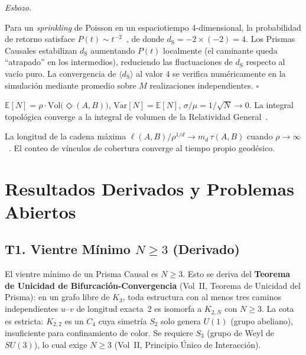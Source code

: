 \documentclass[11pt, a4paper, openany]{book}
\newcommand{\dS}{d_{\mathrm{S}}}
\newcommand{\diam}[2]{\Diamond(#1,#2)}
\renewenvironment{proof}[1][Demostraci\'on]{%
  \par\noindent\textit{#1.}\quad
}{\hfill$\square$\par\medskip}
\begin{document}
\begin{proof}[Esbozo]
Para un \emph{sprinkling} de Poisson en un espaciotiempo
4-dimensional, la probabilidad de retorno satisface
$P(t) \sim t^{-2}$~\cite{eichhorn2014}, de donde $\dS = -2
\times (-2) = 4$. Los Prismas Causales estabilizan $\dS$
aumentando $P(t)$ localmente (el caminante queda ``atrapado''
en los intermedios), reduciendo las fluctuaciones de $\dS$
respecto al vac\'io puro. La convergencia de $\langle \dS \rangle$
al valor $4$ se verifica num\'ericamente en la simulaci\'on
mediante promedio sobre $M$ realizaciones independientes.
\end{proof}

\begin{theorem}
\label{thm:app-poisson-vol}
$\mathbb{E}[N] = \rho \cdot \mathrm{Vol}\bigl(\diam{A}{B}\bigr)$,
$\mathrm{Var}[N] = \mathbb{E}[N]$, $\sigma/\mu = 1/\sqrt{N}
\to 0$. La integral topol\'ogica converge a la integral de
volumen de la Relatividad General~\cite{bombelli1987}.
\end{theorem}

\begin{theorem}
\label{thm:app-mm}
La longitud de la cadena m\'axima
$\ell(A,B)/\rho^{1/d} \to m_d\,\tau(A,B)$ cuando
$\rho \to \infty$~\cite{myrheim1978,brightwell1991}. El conteo
de v\'inculos de cobertura converge al tiempo propio
geod\'esico.
\end{theorem}

\section{Resultados Derivados y Problemas Abiertos}

\subsection*{T1. Vientre M\'inimo $N \geq 3$ (Derivado)}
\label{thm-ref:min-belly}

El vientre m\'inimo de un Prisma Causal es $N \geq 3$. Esto se
deriva del \textbf{Teorema de Unicidad de Bifurcaci\'on-Convergencia}
(Vol~II, Teorema de Unicidad del Prisma): en un grafo libre de $K_3$,
toda estructura con al menos tres caminos independientes $u$--$v$ de
longitud exacta~2 es isomorfa a $K_{2,N}$ con $N \geq 3$. La cota es
estricta: $K_{2,2}$ es un $C_4$ cuya simetr\'ia $S_2$ solo genera
$U(1)$ (grupo abeliano), insuficiente para confinamiento de color. Se
requiere $S_3$ (grupo de Weyl de $SU(3)$), lo cual exige $N \geq 3$
(Vol~II, Principio \'Unico de Interacci\'on).
\end{document}
